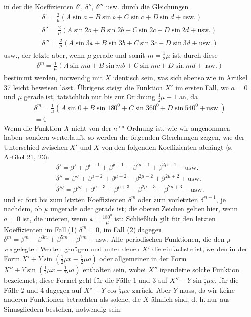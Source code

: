in der die Koeffizienten $\delta'$, $\delta''$, $\delta'''$ usw. durch die Gleichungen
\[
\begin{aligned}
&\delta'=\frac2\mu(A\sin a+B\sin b+C\sin c+D\sin d+\text{usw.})\\[6pt]
&\delta''=\frac2\mu(A\sin 2a+B\sin 2b+C\sin 2c+D\sin 2d+\text{usw.})\\[6pt]
&\delta'''=\frac2\mu(A\sin 3a+B\sin 3b+C\sin 3c+D\sin 3d+\text{usw.})
\end{aligned}
\]
usw., der letzte aber, wenn $\mu$ gerade und somit $m=\frac12\mu$ ist, durch diese
\[
\begin{aligned}
&\delta^m=\frac1\mu(A\sin ma+B\sin mb+C\sin mc+D\sin md+\text{usw.})
\end{aligned}
\]
bestimmt werden, notwendig mit $X$ identisch sein, was sich ebenso wie in Artikel 37 leicht beweisen lässt. Übrigens steigt die Funktion $X'$ im ersten Fall, wo $a=0$ und $\mu$ gerade ist, tatsächlich nur bis zur Or%
dnung $\frac12\mu-1$ an, da
\[
\begin{aligned}
&\delta^m=\frac1\mu(A\sin 0+B\sin 180^0+C\sin 360^0+D\sin 540^0+\text{usw.})\\[6pt]
&=0
\end{aligned}
\]
Wenn die Funktion $X$ nicht von der $n^{\mathrm{ten}}$ Ordnung ist, wie wir angenommen haben, sondern weiterläuft, so werden die folgenden Gleichungen zeigen, wie der Unterschied zwischen $X'$ und $X$ von den folgenden Koeffizienten abhängt (s. Artikel 21, 23):
\[
\begin{aligned}
&\delta'=\beta'\mp\beta^{\mu-1}\pm\beta^{\mu+1}-\beta^{2\mu-1}+\beta^{2\mu+1}\mp\text{usw.}\\[6pt]
&\delta''=\beta''\mp\beta^{\mu-2}\pm\beta^{\mu+2}-\beta^{2\mu-2}+\beta^{2\mu+2}\mp\text{usw.}\\[6pt]
&\delta'''=\beta'''\mp\beta^{\mu-3}\pm\beta^{\mu+3}-\beta^{2\mu-3}+\beta^{2\mu+3}\mp\text{usw.}
\end{aligned}
\]
und so fort bis zum letzten Koeffizienten $\delta^m$ oder zum vorletzten $\delta^{m-1}$, je nachdem, ob $\mu$ ungerade oder gerade ist; die oberen Zeichen gelten hier, wenn $a=0$ ist, die unteren, wenn $a=\frac{180^0}{\mu}$ ist: Schließlich gilt für den letzten Koeffizienten im Fall (1) $\delta^m=0$, im Fall (2) dagegen
$\delta^m=\beta^m-\beta^{3m}+\beta^{5m}-\beta^{7m}+\text{usw.}$
Alle periodischen Funktionen, die den $\mu$ vorgelegten Werten genügen und unter denen $X'$ die einfachste ist, werden in der Form $X'+Y\sin(\frac12\mu x-\frac12\mu a)$ oder allgemeiner in der Form $X''+Y\sin(\frac12\mu x-\frac12\mu a)$ enthalten sein, wobei $X''$ irgendeine solche Funktion bezeichnet; diese Formel geht für die Fälle 1 und 3 auf $X''+Y\sin\frac12\mu x$, für die Fälle 2 und 4 dagegen auf $X''+Y\cos\frac12\mu x$ zurück. Aber $Y$ muss, da wir keine anderen Funktionen betrachten als solche, die $X$ ähnlich sind, d. h. nur aus Sinusgliedern bestehen, notwendig sein:
